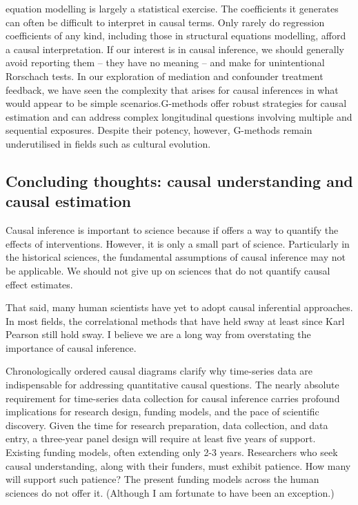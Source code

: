 \documentclass[
  singlecolumn]{report}
\begin{document}
\begin{enumerate}
  equation modelling is largely a statistical exercise. The coefficients
  it generates can often be difficult to interpret in causal terms. Only
  rarely do regression coefficients of any kind, including those in
  structural equations modelling, afford a causal interpretation. If our
  interest is in causal inference, we should generally avoid reporting
  them -- they have no meaning -- and make for unintentional Rorschach
  tests. In our exploration of mediation and confounder treatment
  feedback, we have seen the complexity that arises for causal
  inferences in what would appear to be simple scenarios.G-methods offer
  robust strategies for causal estimation and can address complex
  longitudinal questions involving multiple and sequential exposures.
  Despite their potency, however, G-methods remain underutilised in
  fields such as cultural evolution.
\end{enumerate}

\hypertarget{concluding-thoughts-causal-understanding-and-causal-estimation}{%
\subsection{Concluding thoughts: causal understanding and causal
estimation}\label{concluding-thoughts-causal-understanding-and-causal-estimation}}

Causal inference is important to science because if offers a way to
quantify the effects of interventions. However, it is only a small part
of science. Particularly in the historical sciences, the fundamental
assumptions of causal inference may not be applicable. We should not
give up on sciences that do not quantify causal effect estimates.

That said, many human scientists have yet to adopt causal inferential
approaches. In most fields, the correlational methods that have held
sway at least since Karl Pearson still hold sway. I believe we are a
long way from overstating the importance of causal inference.

Chronologically ordered causal diagrams clarify why time-series data are
indispensable for addressing quantitative causal questions. The nearly
absolute requirement for time-series data collection for causal
inference carries profound implications for research design, funding
models, and the pace of scientific discovery. Given the time for
research preparation, data collection, and data entry, a three-year
panel design will require at least five years of support. Existing
funding models, often extending only 2-3 years. Researchers who seek
causal understanding, along with their funders, must exhibit patience.
How many will support such patience? The present funding models across
the human sciences do not offer it. (Although I am fortunate to have
been an exception.)
\end{document}
